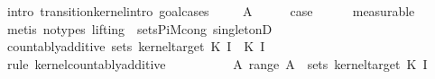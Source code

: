 \begin{isabellebody}
%
\isadelimproof
%
\endisadelimproof
%
\isatagproof
{}\isamarkupfalse%
\ {\isacharparenleft}{\kern0pt}intro\ transition{\isacharunderscore}{\kern0pt}kernel{\isachardot}{\kern0pt}intro{\isacharcomma}{\kern0pt}\ goal{\isacharunderscore}{\kern0pt}cases{\isacharparenright}{\kern0pt}\isanewline
\ \ \isamarkupfalse%
\ {\isacharparenleft}{\kern0pt}{}\ A{\isacharprime}{\kern0pt}{\isacharparenright}{\kern0pt}\isanewline
\ \ \isamarkupfalse%
\ \isamarkupfalse%
\ {\isacharquery}{\kern0pt}case\isanewline
\ \ \ \ \isamarkupfalse%
\ measurable\isanewline
\ \ \ \ \isamarkupfalse%
\ {\isacharparenleft}{\kern0pt}metis\ {\isacharparenleft}{\kern0pt}no{\isacharunderscore}{\kern0pt}types{\isacharcomma}{\kern0pt}\ lifting{\isacharparenright}{\kern0pt}\ {}\ sets{\isacharunderscore}{\kern0pt}PiM{\isacharunderscore}{\kern0pt}cong\ singletonD{\isacharparenright}{\kern0pt}\isanewline
{}\isamarkupfalse%
\isanewline
\ \ \isamarkupfalse%
\ {\isacharparenleft}{\kern0pt}{}\ {\isasymomega}{\isacharparenright}{\kern0pt}\isanewline
\ \ \isamarkupfalse%
\ \isamarkupfalse%
\ {\isachardoublequoteopen}countably{\isacharunderscore}{\kern0pt}additive\ {\isacharparenleft}{\kern0pt}sets\ {\isacharparenleft}{\kern0pt}kernel{\isacharunderscore}{\kern0pt}target\ {\isacharparenleft}{\kern0pt}K\ {\isacharparenleft}{\kern0pt}I\ {}{\isacharparenright}{\kern0pt}{\isacharparenright}{\kern0pt}{\isacharparenright}{\kern0pt}{\isacharparenright}{\kern0pt}\ {\isacharparenleft}{\kern0pt}K\ {\isacharparenleft}{\kern0pt}I\ {}{\isacharparenright}{\kern0pt}\ {\isasymomega}{\isacharparenright}{\kern0pt}{\isachardoublequoteclose}\isanewline
\ \ \ \ \isamarkupfalse%
\ {\isacharparenleft}{\kern0pt}rule\ kernel{\isachardot}{\kern0pt}countably{\isacharunderscore}{\kern0pt}additive{\isacharparenright}{\kern0pt}\isanewline
\ \ \isamarkupfalse%
\ \isamarkupfalse%
\ {\isacharasterisk}{\kern0pt}{\isacharcolon}{\kern0pt}\isanewline
\ \ \ \ {\isachardoublequoteopen}{\isasymAnd}A{\isachardot}{\kern0pt}\ {\isasymlbrakk}range\ A\ {\isasymsubseteq}\ {\isacharparenleft}{\kern0pt}sets\ {\isacharparenleft}{\kern0pt}kernel{\isacharunderscore}{\kern0pt}target\ {\isacharparenleft}{\kern0pt}K\ {\isacharparenleft}{\kern0pt}I\ {}{\isacharparenright}{\kern0pt}{\isacharparenright}{\kern0pt}{\isacharparenright}{\kern0pt}{\isacharparenright}{\kern0pt}{\isacharsemicolon}{\kern0pt}\ \isanewline

\end{isabellebody}
